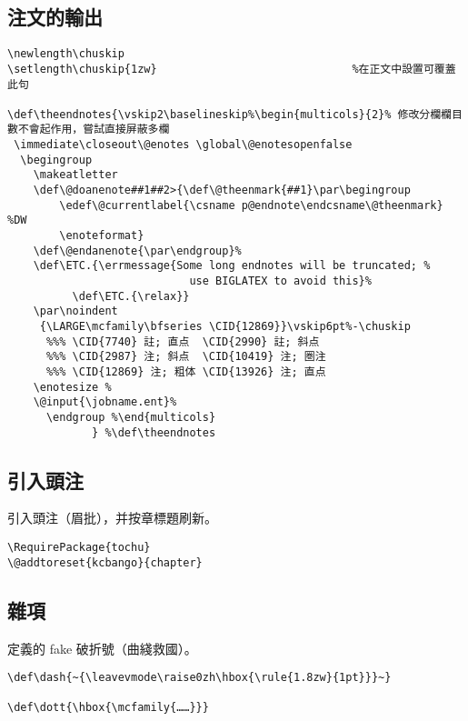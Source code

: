 \subsection{注文的輸出}

\begin{lstlisting}[firstnumber=1518]
\newlength\chuskip
\setlength\chuskip{1zw}  							 %在正文中設置可覆蓋此句

\def\theendnotes{\vskip2\baselineskip%\begin{multicols}{2}% 修改分欄欄目數不會起作用，嘗試直接屏蔽多欄
 \immediate\closeout\@enotes \global\@enotesopenfalse
  \begingroup
    \makeatletter
    \def\@doanenote##1##2>{\def\@theenmark{##1}\par\begingroup
        \edef\@currentlabel{\csname p@endnote\endcsname\@theenmark} %DW
        \enoteformat}
    \def\@endanenote{\par\endgroup}%
    \def\ETC.{\errmessage{Some long endnotes will be truncated; %
                            use BIGLATEX to avoid this}%
          \def\ETC.{\relax}}
    \par\noindent
     {\LARGE\mcfamily\bfseries \CID{12869}}\vskip6pt%-\chuskip
      %%% \CID{7740} 註; 直点  \CID{2990} 註; 斜点
      %%% \CID{2987} 注; 斜点  \CID{10419} 注; 圏注
      %%% \CID{12869} 注; 粗体 \CID{13926} 注; 直点
    \enotesize %
    \@input{\jobname.ent}%
      \endgroup %\end{multicols}
             } %\def\theendnotes
\end{lstlisting}



\subsection{引入頭注}

\par 引入頭注（眉批），并按章標題刷新。
\begin{lstlisting}[firstnumber=1544]
\RequirePackage{tochu}
\@addtoreset{kcbango}{chapter}
\end{lstlisting}

\subsection{雜項}

\par 定義的 fake 破折號（曲綫救國）。
\begin{lstlisting}[firstnumber=1548]
%\def\dash{{\leavevmode\kern1mm\raise0.1zh\hbox{\mcfamily{------}}\kern1mm}}
\def\dash{~{\leavevmode\raise0zh\hbox{\rule{1.8zw}{1pt}}}~}

\def\dott{\hbox{\mcfamily{……}}}
\end{lstlisting}



